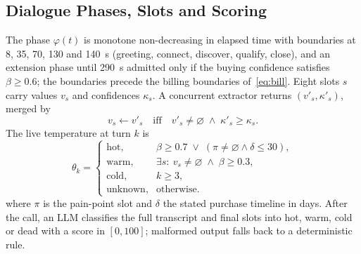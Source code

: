 \documentclass[conference]{IEEEtran}
\begin{document}
\subsection{Dialogue Phases, Slots and Scoring}
The phase $\varphi(t)$ is monotone non-decreasing in elapsed time with boundaries at 8, 35, 70, 130 and 140~s (greeting, connect, discover, qualify, close), and an extension phase until 290~s admitted only if the buying confidence satisfies $\beta\geq 0.6$; the boundaries precede the billing boundaries of~\eqref{eq:bill}. Eight slots $s$ carry values $v_s$ and confidences $\kappa_s$. A concurrent extractor returns $(v'_s,\kappa'_s)$, merged by
\begin{equation}
v_s \leftarrow v'_s \quad\text{iff}\quad v'_s\neq\varnothing \;\wedge\; \kappa'_s\geq\kappa_s .
\label{eq:merge}
\end{equation}
The live temperature at turn $k$ is
\begin{equation}
\theta_k=\begin{cases}
\text{hot}, & \beta\geq 0.7 \;\vee\; (\pi\neq\varnothing \wedge \delta\leq 30),\\
\text{warm}, & \exists s:\ v_s\neq\varnothing \;\wedge\; \beta\geq 0.3,\\
\text{cold}, & k\geq 3,\\
\text{unknown}, & \text{otherwise}.
\end{cases}
\label{eq:temp}
\end{equation}
where $\pi$ is the pain-point slot and $\delta$ the stated purchase timeline in days. After the call, an LLM classifies the full transcript and final slots into hot, warm, cold or dead with a score in $[0,100]$; malformed output falls back to a deterministic rule.
\end{document}
